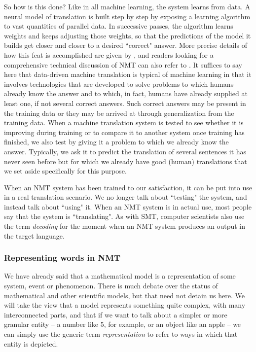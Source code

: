 \documentclass[output=paper]{langscibook}
\begin{document}
So how is this done? Like in all machine learning, the system learns from data. A neural model of translation is built step by step by exposing a learning algorithm to vast quantities of parallel data. In successive passes, the algorithm learns weights and keeps adjusting those weights, so that the predictions of the model it builds get closer and closer to a desired “correct" answer. More precise details of how this feat is accomplished  are given by , and readers looking for a comprehensive technical discussion of NMT can also refer to \citet{Koehn2020}. It suffices to say here that data-driven machine translation is typical of machine learning in that it involves technologies that are developed to solve problems to which humans already know the answer and to which, in fact, humans have already supplied at least one, if not several correct answers. Such correct answers may be present in the training data or they may be arrived at through generalization from the training data. When a machine translation system is tested to see whether it is improving during training or to compare it to another system once training has finished, we also test by giving it a problem to which we already know the answer. Typically, we ask it to predict the translation of several sentences it has never seen before but for which we already have good (human) translations that we set aside specifically for this purpose.   

When an NMT system has been trained to our satisfaction, it can be put into use in a real translation scenario. We no longer talk about “testing" the system, and instead talk about “using" it. When an NMT system is in actual use, most people say that the system is  “translating". As with SMT, computer scientists also use the term \textit{decoding} for the moment when an NMT system produces an output in the target language.

\subsubsection{Representing words in NMT}\largerpage
We have already said that a mathematical model is a representation of some system, event or phenomenon. There is much debate over the status of mathematical and other scientific models, but that need not detain us here. We will take the view that a model represents something quite complex, with many interconnected parts, and that if we want to talk about a simpler or more granular entity -- a number like 5, for example, or an object like an apple -- we can simply use the generic term \textit{representation} to refer to ways in which that entity is depicted. 
\end{document}

